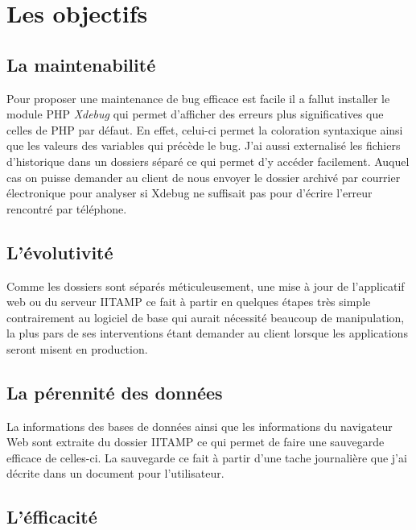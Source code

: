 \section{Les objectifs} %
\label{sec:Les objectifs}

\subsection{La maintenabilité} %
\label{sub:La maintenabilité}

Pour proposer une maintenance de bug efficace est facile il a fallut
installer le module PHP \emph{Xdebug} qui permet d'afficher des erreurs
plus significatives que celles de PHP par défaut. En effet, celui-ci
permet la coloration syntaxique ainsi que les valeurs des variables qui
précède le bug. J'ai aussi externalisé les fichiers d'historique dans un
dossiers séparé ce qui permet d'y accéder facilement. Auquel cas on
puisse demander au client de nous envoyer le dossier archivé par
courrier électronique pour analyser si Xdebug ne suffisait pas pour
d'écrire l'erreur rencontré par téléphone.

\subsection{L'évolutivité} %
\label{sub:L'évolutivité}

Comme les dossiers sont séparés méticuleusement, une mise à jour de
l'applicatif web ou du serveur IITAMP ce fait à partir en quelques
étapes très simple contrairement au logiciel de base qui aurait
nécessité beaucoup de manipulation, la plus pars de ses interventions
étant demander au client lorsque les applications seront misent en
production.

\subsection{La pérennité des données} %
\label{sub:La pérennité des données}

La informations des bases de données ainsi que les informations du
navigateur Web sont extraite du dossier IITAMP ce qui permet de faire
une sauvegarde efficace de celles-ci. La sauvegarde ce fait à partir
d'une tache journalière que j'ai décrite dans un document pour
l'utilisateur.

\subsection{L'éfficacité} %
\label{sub:L'éfficacité}

